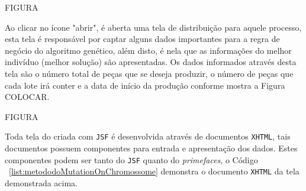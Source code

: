 FIGURA

\par Ao clicar no ícone "abrir", é aberta uma tela de distribuição para aquele processo, esta tela é responsável por captar alguns
dados importantes para a regra de negócio do algoritmo genético, além disto, é nela que as informações do melhor indivíduo (melhor
solução) são apresentadas.  Os dados informados através desta tela são o número total de peças que se deseja produzir, o número de 
peças que cada lote irá conter e a data de início da produção conforme mostra a Figura COLOCAR.


FIGURA



\par Toda tela do criada com \texttt{JSF} é desenvolvida através de documentos \texttt{XHTML}, tais documentos possuem componentes para entrada e apresentação dos dados. Estes componentes podem ser tanto do \texttt{JSF} quanto do \textit{primefaces}, o Código ~\ref{list:metododoMutationOnChromossome} demonstra o documento \texttt{XHTML} da tela demonstrada acima.

